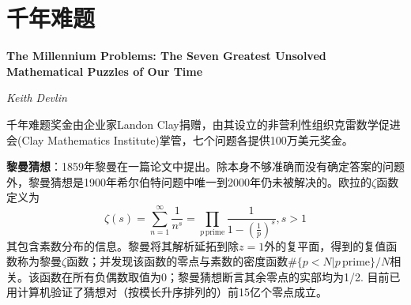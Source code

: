 \chapter{千年难题}
\Large\textbf{The Millennium Problems: The Seven Greatest Unsolved Mathematical Puzzles of Our Time}
\par \emph{Keith Devlin} \normalsize

\par 千年难题奖金由企业家Landon Clay捐赠，由其设立的非营利性组织克雷数学促进会(Clay Mathematics Institute)掌管，七个问题各提供100万美元奖金。

\par \textbf{黎曼猜想}：1859年黎曼在一篇论文中提出。除本身不够准确而没有确定答案的问题外，黎曼猜想是1900年希尔伯特问题中唯一到2000年仍未被解决的。欧拉的$\zeta$函数定义为
\begin{equation}
    \zeta(s)=\sum_{n=1}^\infty \frac{1}{n^s}=\prod_{p\, \text{prime}}\frac{1}{1-(\frac{1}{p})^s}, s>1
\end{equation}
其包含素数分布的信息。黎曼将其解析延拓到除$z=1$外的复平面，得到的复值函数称为黎曼$\zeta$函数；并发现该函数的零点与素数的密度函数$\#\{p<N\vert p\, \text{prime}\}/N$相关。该函数在所有负偶数取值为0；黎曼猜想断言其余零点的实部均为1/2. 目前已用计算机验证了猜想对（按模长升序排列的）前15亿个零点成立。